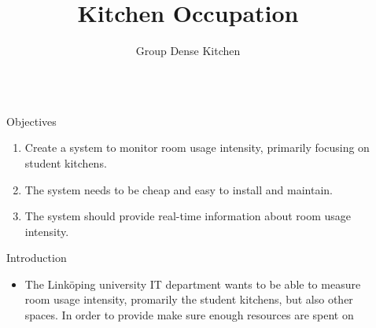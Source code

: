 \documentclass[final,hyperref={pdfpagelabels=false}]{beamer}
\title{\huge Kitchen Occupation} %
\author{Group Dense Kitchen} %
\institute{Department of Electrical Engineering, Link\"{o}öping University} %
\begin{document}

\begin{frame}[t] %

\begin{columns}[t] %

\begin{column}{.02\textwidth}\end{column} %

\begin{column}{.465\textwidth} %


\begin{block}{Objectives}

\begin{enumerate}
\item Create a system to monitor room usage intensity, primarily focusing on student kitchens.
\item The system needs to be cheap and easy to install and maintain.
\item The system should provide real-time information about room usage intensity.
\end{enumerate}

\end{block}

            
\begin{block}{Introduction}

\begin{itemize}
\item The Linköping university IT department wants to be able to measure room usage intensity, promarily the student kitchens, but also other spaces. In order to provide make sure enough resources are spent on 
\end{itemize}


\end{block}
\end{column}
\end{columns}
\end{frame}
\end{document}
